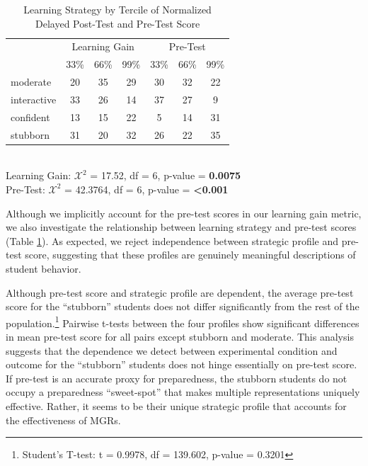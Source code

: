 \documentclass{edm_template}
\begin{document}
\begin{table}[hbtp]
\centering
\begin{tabular}{|l || c | c | c | c | c | c |}
\hline
& \multicolumn{3}{c|}{Learning Gain} & \multicolumn{3}{c|}{Pre-Test} \\ \cline{2-7}
&33\%&66\%&99\%&33\%&66\%&99\%\\ \hline \hline
  moderate   &   20& 35& 29 & 30 & 32 & 22 \\ \hline
  interactive &   33& 26& 14 & 37 & 27 & 9\\ \hline
confident & 13& 15& 22 &5 & 14 & 31\\ \hline
  stubborn & 31& 20& 32 & 26 & 22 & 35 \\ \hline
 \end{tabular} \\
Learning Gain: $\mathcal{X}^2$ = 17.52, df = 6, p-value = {\bf 0.0075} \\
Pre-Test: $\mathcal{X}^{2}$ = 42.3764, df = 6, p-value = {\bf <0.001}
\caption{Learning Strategy by Tercile of Normalized Delayed Post-Test and Pre-Test Score}
\label{tab:LS-by-score}
\end{table}

Although we implicitly account for the pre-test scores in our learning gain metric, we also investigate the relationship between learning strategy and pre-test scores (Table \ref{tab:LS-by-score}). As expected, we reject independence between strategic profile and pre-test score, suggesting that these profiles are genuinely meaningful descriptions of student behavior.

Although pre-test score and strategic profile are dependent, the average pre-test score for the ``stubborn'' students does not differ significantly from the rest of the population.\footnote{Student's T-test: t = 0.9978, df = 139.602, p-value = 0.3201} Pairwise t-tests between the four profiles show significant differences in mean pre-test score for all pairs except stubborn and moderate. This analysis suggests that the dependence we detect between experimental condition and outcome for the ``stubborn'' students does not hinge essentially on pre-test score. If pre-test is an accurate proxy for preparedness, the stubborn students do not occupy a preparedness ``sweet-spot'' that makes multiple representations uniquely effective. Rather, it seems to be their unique strategic profile that accounts for the effectiveness of MGRs.

\end{document}
